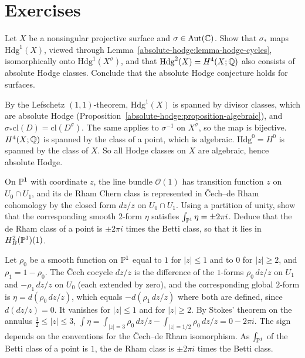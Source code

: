 \section{Exercises}\label{absolute-hodge:section-exercises}

\begin{exercise}\label{absolute-hodge:exercise-picard}
Let $X$ be a nonsingular projective surface and $\sigma \in \mathrm{Aut}(\mathbb{C})$. Show that $\sigma_*$ maps $\mathrm{Hdg}^1(X)$, viewed through Lemma~\ref{absolute-hodge:lemma-hodge-cycles}, isomorphically onto
$\mathrm{Hdg}^1(X^\sigma)$, and that $\mathrm{Hdg}^2(X) = H^4(X; \mathbb{Q})$ also consists of absolute Hodge classes. Conclude that the absolute Hodge conjecture holds for surfaces.
\end{exercise}

\begin{solution}
By the Lefschetz $(1,1)$-theorem, $\mathrm{Hdg}^1(X)$ is spanned by divisor classes, which are absolute Hodge (Proposition~\ref{absolute-hodge:proposition-algebraic}), and $\sigma_*\mathrm{cl}(D) = \mathrm{cl}(D^\sigma)$.
The same applies to $\sigma^{-1}$ on $X^\sigma$, so the map is bijective. $H^4(X; \mathbb{Q})$ is spanned by the class of a point, which is algebraic. $\mathrm{Hdg}^0 = H^0$ is spanned by the class of $X$. So all Hodge
classes on $X$ are algebraic, hence absolute Hodge.
\end{solution}

\begin{exercise}\label{absolute-hodge:exercise-two-pi-i}
On $\mathbb{P}^1$ with coordinate $z$, the line bundle $\mathcal{O}(1)$ has transition function $z$ on $U_0 \cap U_1$, and its de Rham Chern class is represented in \v{C}ech--de Rham cohomology by the closed
form $dz/z$ on $U_0 \cap U_1$. Using a partition of unity, show that the corresponding smooth $2$-form $\eta$ satisfies $\int_{\mathbb{P}^1}\eta = \pm 2\pi i$. Deduce that the de Rham class of a point is $\pm 2\pi i$ times the
Betti class, so that it lies in $H^2_B(\mathbb{P}^1)(1)$.
\end{exercise}

\begin{solution}
Let $\rho_0$ be a smooth function on $\mathbb{P}^1$ equal to $1$ for $|z| \leq 1$ and to $0$ for $|z| \geq 2$, and $\rho_1 = 1 - \rho_0$. The \v{C}ech cocycle $dz/z$ is the difference of the $1$-forms $\rho_0\,dz/z$ on $U_1$ and
$-\rho_1\,dz/z$ on $U_0$ (each extended by zero), and the corresponding global $2$-form is $\eta = d(\rho_0\,dz/z)$, which equals $-d(\rho_1\,dz/z)$ where both are defined, since $d(dz/z) = 0$. It vanishes for $|z| \leq 1$
and for $|z| \geq 2$. By Stokes' theorem on the annulus $\frac12 \leq |z| \leq 3$, $\int\eta = \int_{|z|=3}\rho_0\,dz/z - \int_{|z|=1/2}\rho_0\,dz/z = 0 - 2\pi i$. The sign depends on the conventions for the
\v{C}ech--de Rham isomorphism. As $\int_{\mathbb{P}^1}$ of the Betti class of a point is $1$, the de Rham class is $\pm 2\pi i$ times the Betti class.
\end{solution}

